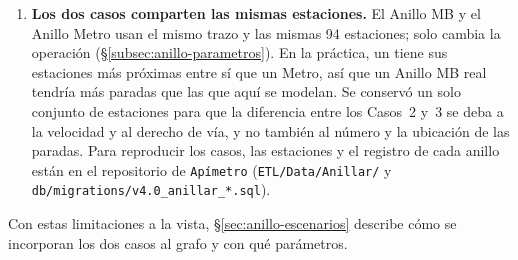 \begin{enumerate}
    \item \textbf{Los dos casos comparten las mismas estaciones.} El Anillo MB y el
    Anillo Metro usan el mismo trazo y las mismas 94 estaciones; solo cambia la
    operación (§\ref{subsec:anillo-parametros}). En la práctica, un \brt{} tiene
    sus estaciones más próximas entre sí que un Metro, así que un Anillo MB real
    tendría más paradas que las que aquí se modelan. Se conservó un solo conjunto
    de estaciones para que la diferencia entre los Casos~2 y~3 se deba a la
    velocidad y al derecho de vía, y no también al número y la ubicación de las
    paradas. Para reproducir los casos, las estaciones y el registro de cada anillo
    están en el repositorio de \texttt{Apímetro}
    (\texttt{ETL/Data/Anillar/} y \texttt{db/migrations/v4.0\_anillar\_*.sql}).
\end{enumerate}

Con estas limitaciones a la vista, §\ref{sec:anillo-escenarios} describe cómo
se incorporan los dos casos al grafo y con qué parámetros.
